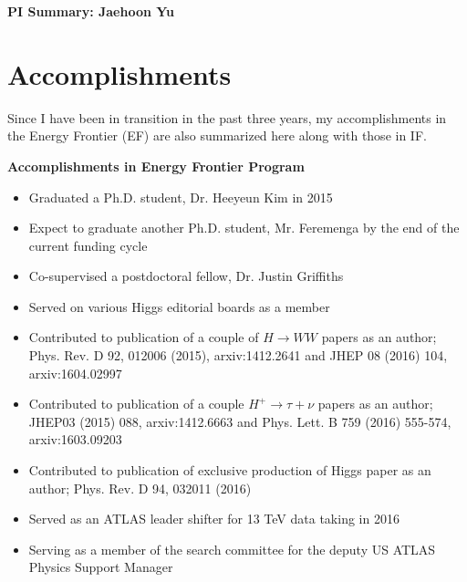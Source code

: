\begin{center}
\LARGE\textbf{PI Summary: Jaehoon Yu}
\end{center}

\section*{\textbf{Accomplishments}}
Since I have been in transition in the past three years, my accomplishments in the Energy Frontier (EF) are also summarized here along with those in IF. 

\noindent\textbf{Accomplishments in Energy Frontier Program}
\begin{itemize}[noitemsep,nolistsep]
\item{Graduated a Ph.D. student, Dr. Heeyeun Kim in 2015}
\item{Expect to graduate another Ph.D. student, Mr. Feremenga by the end of the current funding cycle}
\item{Co-supervised a postdoctoral fellow, Dr. Justin Griffiths}
\item{Served on various Higgs editorial boards as a member}
\item{Contributed to publication of a couple of $H\rightarrow WW$ papers as an author; Phys. Rev. D 92, 012006 (2015), arxiv:1412.2641 and JHEP 08 (2016) 104, arxiv:1604.02997}
\item{Contributed to publication of a couple $H^{+}\rightarrow \tau+\nu$ papers as an author; JHEP03 (2015) 088, arxiv:1412.6663 and Phys. Lett. B 759 (2016) 555-574, arxiv:1603.09203}
\item{Contributed to publication of exclusive production of Higgs paper as an author; Phys. Rev. D 94, 032011 (2016)}
\item{Served as an ATLAS leader shifter for 13 TeV data taking in 2016}
\item{Serving as a member of the search committee for the deputy US ATLAS Physics Support Manager}
\end{itemize}

